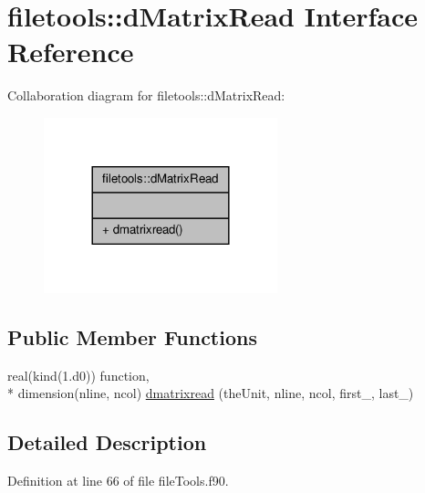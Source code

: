 \hypertarget{interfacefiletools_1_1d_matrix_read}{\section{filetools\-:\-:d\-Matrix\-Read Interface Reference}
\label{interfacefiletools_1_1d_matrix_read}
}


Collaboration diagram for filetools\-:\-:d\-Matrix\-Read\-:\nopagebreak
\begin{figure}[H]
\begin{center}
\leavevmode
\includegraphics[width=192pt]{interfacefiletools_1_1d_matrix_read__coll__graph}
\end{center}
\end{figure}
\subsection*{Public Member Functions}
\begin{DoxyCompactItemize}
\item 
real(kind(1.d0)) function, \\*
dimension(nline, ncol) \hyperlink{interfacefiletools_1_1d_matrix_read_ade43d60737b02be7730f15a6cdf20b83}{dmatrixread} (the\-Unit, nline, ncol, first\-\_\-, last\-\_\-)
\end{DoxyCompactItemize}


\subsection{Detailed Description}


Definition at line 66 of file file\-Tools.\-f90.



